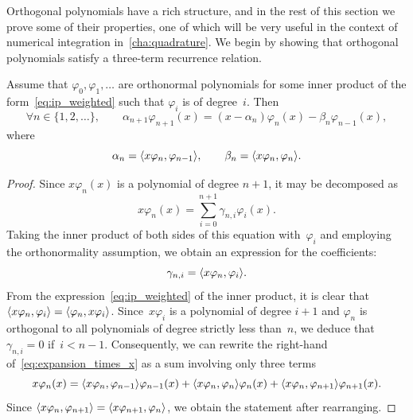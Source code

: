 Orthogonal polynomials have a rich structure,
and in the rest of this section we prove some of their properties,
one of which will be very useful in the context of numerical integration in~\cref{cha:quadrature}.
We begin by showing that orthogonal polynomials satisfy a three-term recurrence relation.
\begin{proposition}
    Assume that $\varphi_0, \varphi_1, \dotsc$ are orthonormal polynomials
    for some inner product of the form~\eqref{eq:ip_weighted} such that $\varphi_i$ is of degree~$i$.
    Then
    \[
        \forall n \in \{1, 2, \dotsc\}, \qquad
        \alpha_{n+1} \varphi_{n+1} (x) = (x - \alpha_n) \varphi_n(x) - \beta_n \varphi_{n-1}(x),
    \]
    where
    \[
        \alpha_n = \ip[big]{x \varphi_n, \varphi_{n-1}},
        \qquad \beta_n = \ip[big]{x \varphi_n, \varphi_{n}}.
    \]
\end{proposition}
\begin{proof}
    Since $x \varphi_n(x)$ is a polynomial of degree $n+1$,
    it may be decomposed as
    \begin{equation}
        \label{eq:expansion_times_x}
        x \varphi_n(x) = \sum_{i=0}^{n+1} \gamma_{n,i} \varphi_i(x).
    \end{equation}
    Taking the inner product of both sides of this equation with~$\varphi_i$
    and employing the orthonormality assumption,
    we obtain an expression for the coefficients:
    \[
        \gamma_{n,i} = \ip[big]{x \varphi_n, \varphi_i}.
    \]
    From the expression~\eqref{eq:ip_weighted} of the inner product,
    it is clear that $\ip[big]{x \varphi_n, \varphi_i} = \ip[big]{\varphi_n, x\varphi_i}$.
    Since~$x \varphi_i$ is a polynomial of degree $i+1$ and $\varphi_n$ is orthogonal to all polynomials of degree strictly less than~$n$,
    we deduce that $\gamma_{n,i} = 0$ if~$i < n-1$.
    Consequently, we can rewrite the right-hand of~\eqref{eq:expansion_times_x} as a sum involving only three terms
    \begin{equation}
        \label{eq:expansion_times_x_good}
        x \varphi_n(x) =  \ip[big]{x \varphi_n, \varphi_{n-1}} \varphi_{n-1}(x) + \ip[big]{x \varphi_n, \varphi_{n}} \varphi_{n}(x) + \ip[big]{x \varphi_n, \varphi_{n+1}} \varphi_{n+1}(x).
    \end{equation}
    Since $\ip[big]{x \varphi_n, \varphi_{n+1}} = \ip[big]{x \varphi_{n+1}, \varphi_{n}}$,
    we obtain the statement after rearranging.
\end{proof}

